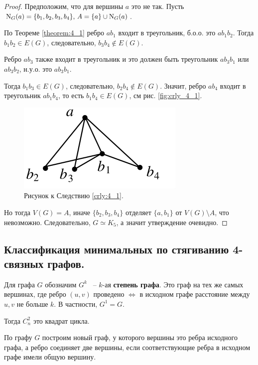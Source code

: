 \begin{proof}

	Предположим, что для вершины $a$ это не так.
	Пусть $\operatorname{N}_G(a) = \{b_1, b_2, b_3, b_4\}, \, A = \{a\} \cup \operatorname{N}_G(a)$.

	По Теореме \ref{theorem:4_1} ребро $ab_1$ входит в треугольник, б.о.о. это $ab_1b_2$.
	Тогда $b_1b_2 \in E(G)$, следовательно, $b_3b_4 \not \in E(G)$.

	Ребро $ab_3$ также входит в треугольник и это должен быть треугольник $ab_3b_1$ или $ab_3b_2$, н.у.о. это $ab_3b_1$.

	Тогда $b_1b_3 \in E(G)$, следовательно, $b_2b_4 \not \in E(G)$.
	Значит, ребро $ab_4$ входит в треугольник $ab_1b_4$, то есть $b_1b_4 \in E(G)$, см рис. \eqref{fig:crly_4_1}.

	\begin{figure}[ht]
    \centering
	\includegraphics[width=0.25\columnwidth]{figures/crly_4_1.png}
	\caption{Рисунок к Следствию \ref{crly:4_1}.}
    \label{fig:crly_4_1}
	\end{figure}
	Но тогда $V(G) = A$, иначе  $\{b_2, b_3, b_4\}$ отделяет $\{a, b_1\}$ от $V(G) \setminus A$, что невозможно. Следовательно,  $G \simeq K_5$, а значит утверждение очевидно.


\end{proof}

\subsection{Классификация минимальных по стягиванию 4-связных графов.}

\begin{df*}
	Для графа $G$ обозначим  $G^{k}$ ~-- $k$-ая \textbf{степень графа}. Это граф на тех же самых вершинах, где ребро $(u, v)$  проведено $\iff$ в исходном графе расстояние между  $u, v$ не больше  $k$. В частности, $G^{1} = G$.
\end{df*}

Тогда $C_n^{2}$ это квадрат цикла.

\begin{df*}
	По графу  $G$ построим новый граф, у которого вершины это ребра исходного графа, а ребро соединяет две вершины, если соответствующие ребра в исходном графе имели общую вершину.
\end{df*}

